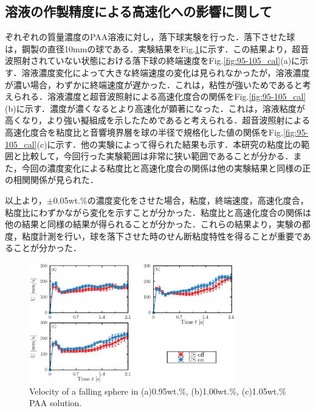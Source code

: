 \subsection{溶液の作製精度による高速化への影響に関して}

ぞれぞれの質量濃度のPAA溶液に対し，落下球実験を行った．落下させた球は，鋼製の直径10mmの球である．実験結果をFig.\ref{fig:95-105velocity}に示す．この結果より，超音波照射されていない状態における落下球の終端速度をFig.\ref{fig:95-105_cal}(a)に示す．溶液濃度変化によって大きな終端速度の変化は見られなかったが，溶液濃度が濃い場合，わずかに終端速度が遅かった．これは，粘性が強いためであると考えられる．溶液濃度と超音波照射による高速化度合の関係をFig.\ref{fig:95-105_cal}(b)に示す．濃度が濃くなるとより高速化が顕著になった．これは，溶液粘度が高くなり，より強い擬組成を示したためであると考えられる．超音波照射による高速化度合を粘度比と音響境界層を球の半径で規格化した値の関係をFig.\ref{fig:95-105_cal}(c)に示す．他の実験によって得られた結果も示す．本研究の粘度比の範囲と比較して，今回行った実験範囲は非常に狭い範囲であることが分かる．また，今回の濃度変化による粘度比と高速化度合の関係は他の実験結果と同様の正の相関関係が見られた．

以上より，$\pm$0.05wt.\%の濃度変化をさせた場合，粘度，終端速度，高速化度合，粘度比にわずかながら変化を示すことが分かった．粘度比と高速化度合の関係は他の結果と同様の結果が得られることが分かった．これらの結果より，実験の都度，粘度計測を行い，球を落下させた時のせん断粘度特性を得ることが重要であることが分かった．

\begin{figure}[H]
    \includegraphics[width=0.8\textwidth]{X-Appendix/concentration_diff/concentration_diff.eps}
    \caption{Velocity of a falling sphere in (a)0.95wt.\%, (b)1.00wt.\%, (c)1.05wt.\% PAA solution.}
    \label{fig:95-105velocity}
\end{figure}

